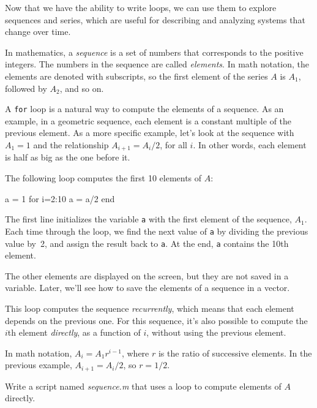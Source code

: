 Now that we have the ability to write loops, we can use them to explore sequences and series, which are useful for describing and analyzing systems that change over time.

In mathematics, a \emph{sequence} is a set of numbers that corresponds to the positive integers.  The numbers in the sequence are called \emph{elements}.  In math notation, the elements are denoted with subscripts, so the first element of the series $A$ is
$A_1$, followed by $A_2$, and so on.


A \lstinline{for} loop is a natural way to compute the elements of a sequence.
As an example, in a geometric sequence, each element is a constant
multiple of the previous element.  As a more specific example, let's
look at the sequence with $A_1 = 1$ and the relationship $A_{i+1} = A_i/2$,
for all $i$.  In other words, each element is half as big as the one before it.

The following loop computes the first 10 elements of $A$:

\begin{code}
a = 1
for i=2:10
    a = a/2
end
\end{code}

The first line initializes the variable \lstinline{a} with the first element of the sequence, $A_1$.
Each time through the loop, we find the next value of \lstinline{a}
by dividing the previous value by~2, and assign the result back to \lstinline{a}.
At the end, \lstinline{a} contains the 10th element.

The other elements are displayed on the screen, but they are not saved in a variable.
Later, we'll see how to save the elements of a sequence in a vector.


This loop computes the sequence \emph{recurrently}, which means
that each element depends on the previous one.
For this sequence, it's also possible to compute the $i$th element
\emph{directly}, as a function of $i$, without using the previous element.

In math notation, $A_i = A_1 r^{i-1}$, where $r$ is the ratio of successive elements.
In the previous example, $A_{i+1} = A_i/2$, so $r = 1/2$.

\begin{ex}
Write a script named \emph{sequence.m} that uses a loop to
compute elements of $A$ \mbox{directly}.
\end{ex}



